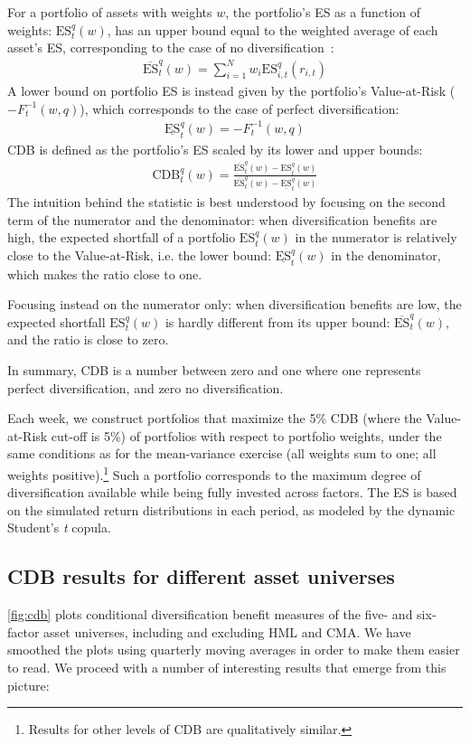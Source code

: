 For a portfolio of assets with weights $w$, the portfolio's ES as a function of weights: $\text{ES}_t^q(w)$, has an upper bound equal to the weighted average of each asset's ES, corresponding to the case of no diversification~\autocite{Artzner1999}:
\begin{align}
  \overline{\text{ES}}_t^q(w) = \sum_{i=1}^N w_i \text{ES}_{i,t}^q(r_{i,t})
\end{align}
A lower bound on portfolio ES is instead given by the portfolio's Value-at-Risk ($-F_{t}^{-1}(w, q)$), which corresponds to the case of perfect diversification:
\begin{align}
  \underline{\text{ES}}_t^q(w) = -F_{t}^{-1}(w, q)
\end{align}
CDB is defined as the portfolio's ES scaled by its lower and upper bounds:
\begin{align}
  \text{CDB}_t^q(w) = \frac{\overline{\text{ES}}_t^q(w) - \text{ES}_t^q(w)}{\overline{\text{ES}}_t^q(w) - \underline{\text{ES}}_t^q(w)}
\end{align}
The intuition behind the statistic is best understood by focusing on the second term of the numerator and the denominator: when diversification benefits are high, the expected shortfall of a portfolio $\text{ES}_t^q(w)$ in the numerator is relatively close to the Value-at-Risk, i.e. the lower bound: $\underline{\text{ES}}_t^q(w)$ in the denominator, which makes the ratio close to one. 

Focusing instead on the numerator only: when diversification benefits are low, the expected shortfall $\text{ES}_t^q(w)$ is hardly different from its upper bound: $\overline{\text{ES}}_t^q(w)$, and the ratio is close to zero.

In summary, CDB is a number between zero and one where one represents perfect diversification, and zero no diversification.

Each week, we construct portfolios that maximize the 5\% CDB (where the Value-at-Risk cut-off is 5\%) of portfolios with respect to portfolio weights, under the same conditions as for the mean-variance exercise (all weights sum to one; all weights positive).\footnote{Results for other levels of CDB are qualitatively similar.} Such a portfolio corresponds to the maximum degree of diversification available while being fully invested across factors. The ES is based on the simulated return distributions in each period, as modeled by the dynamic Student's \textit{t} copula.

\subsection{CDB results for different asset universes}
\autoref{fig:cdb} plots conditional diversification benefit measures of the five- and six-factor asset universes, including and excluding HML and CMA. We have smoothed the plots using quarterly moving averages in order to make them easier to read. We proceed with a number of interesting results that emerge from this picture:

